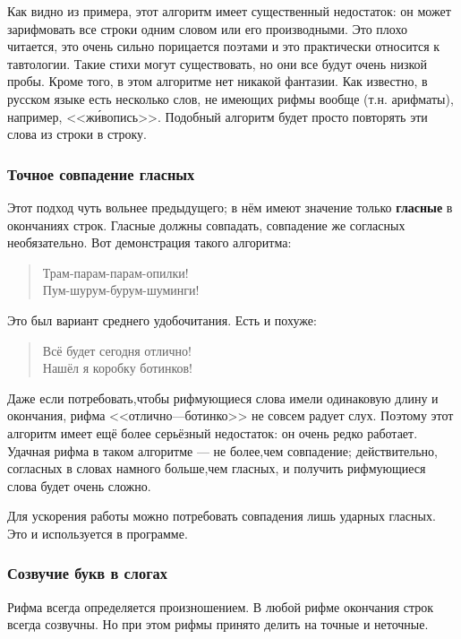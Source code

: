 Как видно из примера, этот алгоритм имеет существенный недостаток: он может зарифмовать все строки одним словом или его производными. Это плохо читается, это очень сильно порицается поэтами и это практически относится к тавтологии. Такие стихи могут существовать, но они все будут очень низкой пробы. Кроме того, в этом алгоритме нет никакой фантазии. Как известно, в русском языке есть несколько слов, не имеющих рифмы вообще (т.н. арифматы), например, <<ж\'{и}вопись>>. Подобный алгоритм будет просто повторять эти слова из строки в строку.

\subsubsection{Точное совпадение гласных}

Этот подход чуть вольнее предыдущего; в нём имеют значение только \textbf{гласные} в окончаниях строк. Гласные должны совпадать, совпадение же согласных необязательно. Вот демонстрация такого алгоритма:

\begin{verse}
Трам-парам-парам-опилки!\\
Пум-шурум-бурум-шуминги!
\end{verse}

Это был вариант среднего удобочитания. Есть и похуже:

\begin{verse}
Всё будет сегодня отлично!\\
Нашёл я коробку ботинков!
\end{verse}

Даже если потребовать,чтобы рифмующиеся слова имели одинаковую длину и окончания, рифма <<отлично---ботинко>> не совсем радует слух. Поэтому этот алгоритм имеет ещё более серьёзный недостаток: он очень редко работает. Удачная рифма в таком алгоритме --- не более,чем совпадение; действительно, согласных в словах намного больше,чем гласных, и получить рифмующиеся слова будет очень сложно.

Для ускорения работы можно потребовать совпадения лишь ударных гласных. Это и используется в программе.

\subsubsection{Созвучие букв в слогах}

Рифма всегда определяется произношением. В любой рифме окончания строк всегда созвучны. Но при этом рифмы принято делить на точные и неточные.

